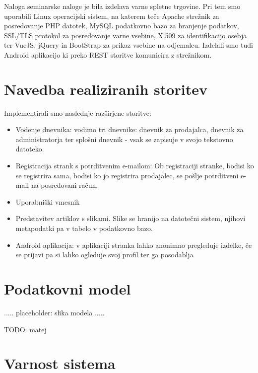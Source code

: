 \documentclass[a4paper,12pt]{report}
\begin{document}
Naloga seminarske naloge je bila izdelava varne spletne trgovine. Pri tem smo uporabili Linux operacijski sistem, na katerem teče Apache strežnik za posredovanje PHP datotek, MySQL podatkovno bazo za hranjenje podatkov, SSL/TLS protokol za posredovanje varne vsebine, X.509 za identifikacijo osebja ter VueJS, jQuery in BootStrap za prikaz vsebine na odjemalcu. Izdelali smo tudi Android aplikacijo ki preko REST storitve komunicira z strežnikom.


\chapter{Navedba realiziranih storitev}

Implementirali smo naslednje razširjene storitve:

\begin{itemize}  
\item Vodenje dnevnika: vodimo tri dnevnike: dnevnik za prodajalca, dnevnik za administratorja ter splošni dnevnik - vsak se zapisuje v svojo tekstovno datoteko.
\item Registracija strank s potrditvenim e-mailom: Ob registraciji stranke, bodisi ko se registrira sama, bodisi ko jo registrira prodajalec, se pošlje potrditveni e-mail na posredovani račun.
\item Uporabniški vmesnik
\item Predstavitev artiklov s slikami. Slike se hranijo na datotečni sistem, njihovi metapodatki pa v tabelo v podatkovno bazo.
\item Android aplikacija: v aplikaciji stranka lahko anonimno pregleduje izdelke, če se prijavi pa si lahko ogleduje svoj profil ter ga posodablja
\end{itemize}



\chapter{Podatkovni model}

..... placeholder: slika modela  .....

TODO: matej

\chapter{Varnost sistema}
\end{document}

